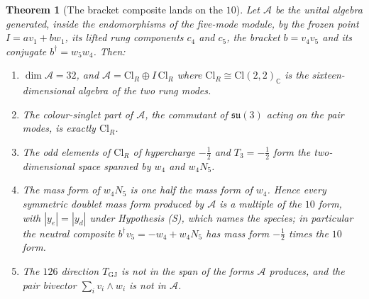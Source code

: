 \documentclass[11pt]{article}
\newtheorem{theorem}{Theorem}[section]
\theoremstyle{definition}
\theoremstyle{plain}
\newcommand{\changedmark}[2]{\marginpar{\raggedright\scriptsize\color{#1}#2}}
\providecommand{\C}{}\renewcommand{\C}{\mathbb{C}}
\providecommand{\Cl}{}\renewcommand{\Cl}{\mathrm{Cl}}
\providecommand{\su}{}\renewcommand{\su}{\mathfrak{su}}
\begin{document}
\begin{theorem}[The bracket composite lands on the $10$]\label{c:standard-model.bracket-composite-lands}
\changedmark{gray}{reworded}
Let $\mathcal{A}$ be the unital algebra generated, inside the endomorphisms of the five-mode module, by the frozen point $I = av_{1} + bw_{1}$, its lifted rung components $c_{4}$ and $c_{5}$, the bracket $b = v_{4}v_{5}$ and its conjugate $b^{\dagger} = w_{5}w_{4}$. Then:
\begin{enumerate}
\item[(i)] $\dim \mathcal{A} = 32$, and $\mathcal{A} = \Cl_{R} \oplus I\,\Cl_{R}$ where $\Cl_{R} \cong \Cl(2,2)_{\C}$ is the sixteen-dimensional algebra of the two rung modes.
\item[(ii)] The colour-singlet part of $\mathcal{A}$, the commutant of $\su(3)$ acting on the pair modes, is exactly $\Cl_{R}$.
\item[(iii)] The odd elements of $\Cl_{R}$ of hypercharge $-\tfrac12$ and $T_{3} = -\tfrac12$ form the two-dimensional space spanned by $w_{4}$ and $w_{4}N_{5}$.
\item[(iv)] The mass form of $w_{4}N_{5}$ is one half the mass form of $w_{4}$. Hence every symmetric doublet mass form produced by $\mathcal{A}$ is a multiple of the $10$ form, with $|y_{e}| = |y_{d}|$ under Hypothesis (S), which names the species; in particular the neutral composite $b^{\dagger}v_{5} = -w_{4} + w_{4}N_{5}$ has mass form $-\tfrac12$ times the $10$ form.
\item[(v)] The $126$ direction $T_{\mathrm{GJ}}$ is not in the span of the forms $\mathcal{A}$ produces, and the pair bivector $\sum_{i} v_{i} \wedge w_{i}$ is not in $\mathcal{A}$.
\end{enumerate}
\end{theorem}
\end{document}
